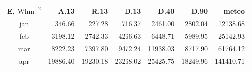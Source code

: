 \begin{tabular}{ | c | r r r r r r | } \hline
E, $\textrm{Whm}^{-2}$	&A.13	&R.13	&D.13	&D.40	&D.90	&meteo\\ \hline
jan		&346.66	&227.28	&716.37	&2461.00	&2802.04	&12138.68\\
feb		&3198.12	&2742.33	&4266.63	&6448.71	&5989.95	&25142.93\\
mar		&8222.23	&7397.80	&9472.24	&11938.03	&8717.90	&61764.12\\
apr		&19886.40	&19230.18	&23268.02	&25425.75	&18249.96	&141410.71\\ \hline
\end{tabular}
